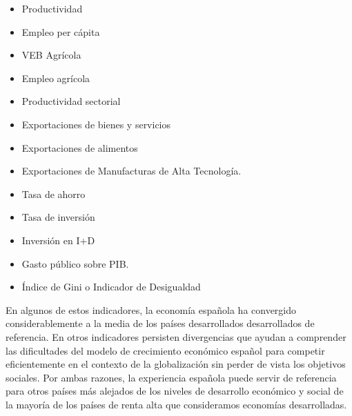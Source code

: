    \begin{itemize}
	\item Productividad 
	\item Empleo per cápita 
	\item VEB Agrícola  
	\item Empleo agrícola 
	\item Productividad sectorial 
	\item Exportaciones de bienes y servicios  
	\item Exportaciones de alimentos 
	\item Exportaciones de Manufacturas de Alta Tecnología. 
	\item Tasa de ahorro  
	\item Tasa de inversión  
	\item Inversión en I+D  
	\item Gasto público sobre PIB. 
	\item Índice de Gini o Indicador de Desigualdad
    \end{itemize}

    En algunos de estos indicadores, la economía española ha convergido considerablemente a la media de los países desarrollados desarrollados de referencia. En otros indicadores persisten divergencias que ayudan a comprender las dificultades del modelo de crecimiento económico español para competir eficientemente en el contexto de la globalización sin perder de vista los objetivos sociales. Por ambas razones, la experiencia española puede servir de referencia para otros países más alejados de los niveles de desarrollo económico y social de la mayoría de los países de renta alta que consideramos economías desarrolladas.





